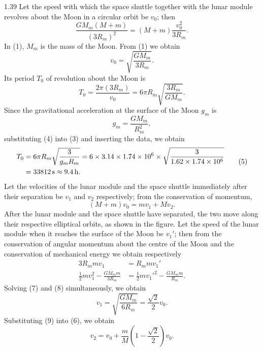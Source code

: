 \begin{solution}{1.39}
Let the speed with which the space shuttle together with the lunar module revolves about the Moon in a circular orbit be $v_0$; then
\begin{equation}
\frac{GM_m(M+m)}{(3R_m)^2}=(M+m)\frac{v_0^2}{3R_m}. \tag{1}
\end{equation}
In (1), $M_m$ is the mass of the Moon. From (1) we obtain
\begin{equation}
v_0=\sqrt{\frac{GM_m}{3R_m}}. \tag{2}
\end{equation}
Its period $T_0$ of revolution about the Moon is
\begin{equation}
T_0=\frac{2\pi(3R_m)}{v_0}=6\pi R_m\sqrt{\frac{3R_m}{GM_m}}. \tag{3}
\end{equation}
Since the gravitational acceleration at the surface of the Moon $g_m$ is
\begin{equation}
g_m=\frac{GM_m}{R_m^2}, \tag{4}
\end{equation}
substituting (4) into (3) and inserting the data, we obtain
\begin{equation}
\begin{aligned}
T_0 &= 6\pi R_m\sqrt{\frac{3}{g_mR_m}}
=6\times3.14\times1.74\times10^6\times\sqrt{\frac{3}{1.62\times1.74\times10^6}}\\
&=33812\,\mathrm{s}\approx9.4\,\mathrm{h}.
\end{aligned} \tag{5}
\end{equation}
Let the velocities of the lunar module and the space shuttle immediately after their separation be $v_1$ and $v_2$ respectively; from the conservation of momentum,
\begin{equation}
(M+m)v_0=mv_1+Mv_2. \tag{6}
\end{equation}
After the lunar module and the space shuttle have separated, the two move along their respective elliptical orbits, as shown in the figure. Let the speed of the lunar module when it reaches the surface of the Moon be $v_1'$; then from the conservation of angular momentum about the centre of the Moon and the conservation of mechanical energy we obtain respectively
\begin{align}
3R_mmv_1 &= R_mmv_1' \tag{7}\\
\frac{1}{2}mv_1^2-\frac{GM_mm}{3R_m} &= \frac{1}{2}mv_1'^2-\frac{GM_mm}{R_m}. \tag{8}
\end{align}
Solving (7) and (8) simultaneously, we obtain
\begin{equation}
v_1=\sqrt{\frac{GM_m}{6R_m}}=\frac{\sqrt{2}}{2}v_0. \tag{9}
\end{equation}
Substituting (9) into (6), we obtain
\begin{equation}
v_2=v_0+\frac{m}{M}\left(1-\frac{\sqrt{2}}{2}\right)v_0. \tag{10}
\end{equation}


\end{solution}

